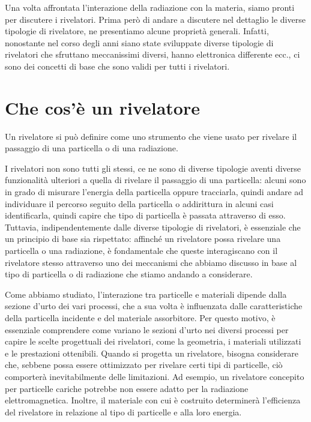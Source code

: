Una volta affrontata l'interazione della radiazione con la materia, siamo pronti per discutere i rivelatori. Prima però di andare a discutere nel dettaglio le diverse tipologie di rivelatore, ne presentiamo alcune proprietà generali. Infatti, nonostante nel corso degli anni siano state sviluppate diverse tipologie di rivelatori che sfruttano meccanissimi diversi, hanno elettronica differente ecc., ci sono dei concetti di base che sono validi per tutti i rivelatori.

\section{Che cos'è un rivelatore}

Un rivelatore si può definire come uno strumento che viene usato per rivelare il passaggio di una particella o di una radiazione.

I rivelatori non sono tutti gli stessi, ce ne sono di diverse tipologie aventi diverse funzionalità ulteriori a quella di rivelare il passaggio di una particella: alcuni sono in grado di misurare l'energia della particella oppure tracciarla, quindi andare ad individuare il percorso seguito della particella o addirittura in alcuni casi identificarla, quindi capire che tipo di particella è passata attraverso di esso. Tuttavia, indipendentemente dalle diverse tipologie di rivelatori, è essenziale che un principio di base sia rispettato: affinché un rivelatore possa rivelare una particella o una radiazione, è fondamentale che queste interagiscano con il rivelatore stesso attraverso uno dei meccanismi che abbiamo discusso in base al tipo di particella o di radiazione che stiamo andando a considerare.

Come abbiamo studiato, l'interazione tra particelle e materiali dipende dalla sezione d'urto dei vari processi, che a sua volta è influenzata dalle caratteristiche della particella incidente e del materiale assorbitore. Per questo motivo, è essenziale comprendere come variano le sezioni d'urto nei diversi processi per capire le scelte progettuali dei rivelatori, come la geometria, i materiali utilizzati e le prestazioni ottenibili. Quando si progetta un rivelatore, bisogna considerare che, sebbene possa essere ottimizzato per rivelare certi tipi di particelle, ciò comporterà inevitabilmente delle limitazioni. Ad esempio, un rivelatore concepito per particelle cariche potrebbe non essere adatto per la radiazione elettromagnetica. Inoltre, il materiale con cui è costruito determinerà l'efficienza del rivelatore in relazione al tipo di particelle e alla loro energia.


